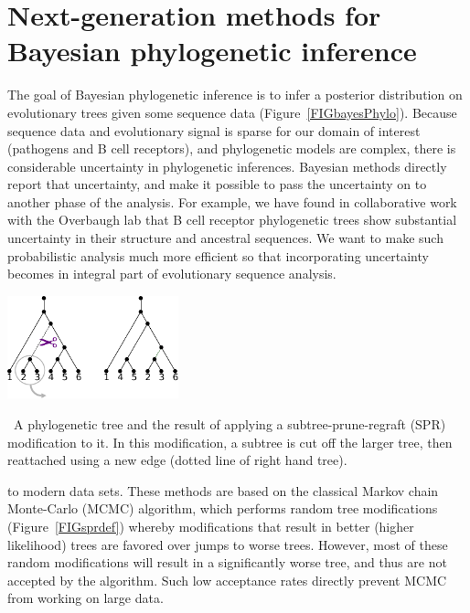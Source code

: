 \documentclass[nobib]{tufte-handout}
\begin{document}
\section{Next-generation methods for Bayesian phylogenetic inference}
\vspace{-0.3cm}
The goal of Bayesian phylogenetic inference is to infer a posterior distribution on evolutionary trees given some sequence data (Figure~\ref{FIGbayesPhylo}).
Because sequence data and evolutionary signal is sparse for our domain of interest (pathogens and B cell receptors), and phylogenetic models are complex, there is considerable uncertainty in phylogenetic inferences.
Bayesian methods directly report that uncertainty, and make it possible to pass the uncertainty on to another phase of the analysis.
For example, we have found in collaborative work with the Overbaugh lab \cite{Simonich2019-nn} that B cell receptor phylogenetic trees show substantial uncertainty in their structure and ancestral sequences.
We want to make such probabilistic analysis much more efficient so that incorporating uncertainty becomes in integral part of evolutionary sequence analysis.

\begin{marginfigure}[-0.in]%
  \includegraphics[width=1.95in]{spr-definition}
  \caption{\
    A phylogenetic tree and the result of applying a subtree-prune-regraft (SPR) modification to it.
    In this modification, a subtree is cut off the larger tree, then reattached using a new edge (dotted line of right hand tree).
    }
  \label{FIGsprdef}
\end{marginfigure}%

 to modern data sets.
These methods are based on the classical Markov chain Monte-Carlo (MCMC) algorithm, which performs random tree modifications (Figure~\ref{FIGsprdef}) whereby modifications that result in better (higher likelihood) trees are favored over jumps to worse trees.
However, most of these random modifications will result in a significantly worse tree, and thus are not accepted by the algorithm.
Such low acceptance rates directly prevent MCMC from working on large data.
\end{document}

